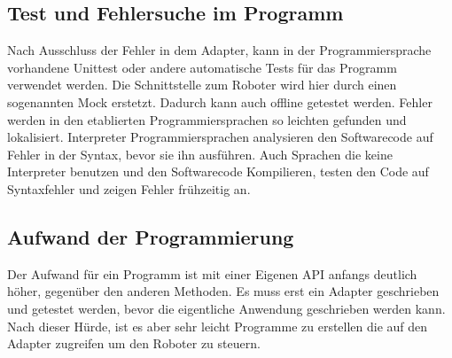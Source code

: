 \subsection{Test und Fehlersuche im Programm}
\label{debuggen_mit_hoeherer schicht}

Nach Ausschluss der Fehler in dem Adapter, kann in der Programmiersprache vorhandene \ac{Unittest} oder andere automatische Tests für das Programm verwendet werden. Die Schnittstelle zum Roboter wird hier durch einen sogenannten \ac{Mock} erstetzt. Dadurch kann auch offline getestet werden. Fehler werden in den etablierten Programmiersprachen so leichten gefunden und lokalisiert. \ac{Interpreter} Programmiersprachen analysieren den Softwarecode auf Fehler in der Syntax, bevor sie ihn ausführen. Auch Sprachen die keine \ac{Interpreter} benutzen und den Softwarecode Kompilieren, testen den Code auf Syntaxfehler und zeigen Fehler frühzeitig an.

\subsection{Aufwand der Programmierung}
\label{eigene_api_aufwand}

Der Aufwand für ein Programm ist mit einer Eigenen API anfangs deutlich höher, gegenüber den anderen Methoden. Es muss erst ein Adapter geschrieben und getestet werden, bevor die eigentliche Anwendung geschrieben werden kann. 
Nach dieser Hürde, ist es aber sehr leicht Programme zu erstellen die auf den Adapter zugreifen um den Roboter zu steuern.
